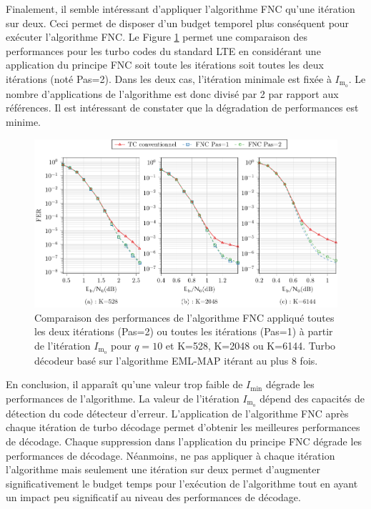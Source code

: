 Finalement, il semble intéressant d'appliquer l'algorithme FNC qu'une itération sur deux. Ceci permet de disposer d'un budget temporel plus conséquent pour exécuter l'algorithme FNC. Le Figure 
\ref{fig:fnc_step} permet une comparaison des performances pour les turbo codes du standard LTE en considérant une application du principe FNC soit toute les itérations 
soit toutes les deux itérations (noté Pas=2). Dans les deux cas, l'itération minimale est fixée à $I_{\text{m}_\text{o}}$. Le nombre d'applications de l'algorithme est donc divisé par 2 par rapport aux références. Il est intéressant de constater  que la dégradation de performances est minime.

\begin{figure}[!t]
	\centering
	\hspace*{-.1\textwidth}
	\includegraphics[width=1.1\textwidth]{main/ch4_fig/final/tikz_last/fnc10_minO_s2.pdf}
	\caption{Comparaison des performances de l'algorithme FNC appliqué toutes les deux itérations (Pas=2) ou toutes
	les itérations (Pas=1) à partir de l'itération $I_{\text{m}_\text{o}}$ pour $q=10$ et K=528,
	K=2048 ou K=6144.
	Turbo décodeur basé sur l'algorithme EML-MAP itérant au plus 8 fois.
	\label{fig:fnc_step}}
	\vspace*{-1em}
\end{figure}

En conclusion, il apparaît qu'une valeur trop faible de $I_\text{min}$ dégrade les performances de l'algorithme. 
La valeur de l'itération $I_{\text{m}_\text{o}}$ dépend des
capacités de détection du code détecteur d'erreur. L'application de l'algorithme FNC après chaque itération de turbo 
décodage permet d'obtenir les meilleures performances de décodage. Chaque suppression dans l'application du principe FNC 
dégrade les performances de décodage. Néanmoins, ne pas appliquer à chaque itération l'algorithme mais seulement une 
itération sur deux permet d'augmenter significativement le budget temps pour l'exécution de l'algorithme tout en ayant 
un impact peu significatif au niveau des performances de décodage. 

